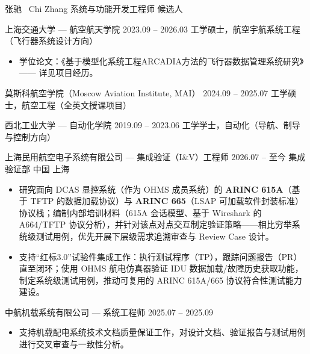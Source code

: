 \documentclass[zh]{resume}
\begin{document}
\resumeheader
  {张驰 \textbar\ Chi Zhang}
  {系统与功能开发工程师 候选人}
  {%
    \contactsep
    \contactsep
    \contactsep
  }


\resumeentry
  {上海交通大学 --- 航空航天学院}
  {2023.09 -- 2026.03}
  {工学硕士，航空宇航系统工程（飞行器系统设计方向）}
  {}
\begin{itemize}
  \item 学位论文：《基于模型化系统工程ARCADIA方法的飞行器数据管理系统研究》—— 详见项目经历。
\end{itemize}

\resumeentry
  {莫斯科航空学院（Moscow Aviation Institute, MAI）}
  {2024.09 -- 2025.07}
  {工学硕士，航空工程（全英文授课项目）}
  {}

\resumeentry
  {西北工业大学 --- 自动化学院}
  {2019.09 -- 2023.06}
  {工学学士，自动化（导航、制导与控制方向）}
  {}


\resumeentry
  {上海民用航空电子系统有限公司 --- 集成验证（I\&V）工程师}
  {2026.07 -- 至今}
  {集成验证部}
  {中国 上海}
\begin{itemize}
  \item 研究面向 DCAS 显控系统（作为 OHMS 成员系统）的 \textbf{ARINC 615A}（基于 TFTP 的数据加载协议）与 \textbf{ARINC 665}（LSAP 可加载软件封装标准）协议栈；编制内部培训材料（615A 会话模型、基于 Wireshark 的 A664/TFTP 协议分析），并针对该点对点交互制定验证策略——相比穷举系统级测试用例，优先开展下层级需求追溯审查与 Review Case 设计。
  \item 支持“红标3.0”试验件集成工作：执行测试程序（TP），跟踪问题报告（PR）直至闭环；使用 OHMS 航电仿真器验证 IDU 数据加载/故障历史获取功能，制定系统级测试用例，推动可复用的 ARINC 615A/665 协议符合性测试能力建设。
\end{itemize}

\resumeentry
  {中航机载系统有限公司 --- 系统工程师}
  {2025.07 -- 2025.09}
  {}
  {}
\begin{itemize}
  \item 支持机载配电系统技术文档质量保证工作，对设计文档、验证报告与测试用例进行交叉审查与一致性分析。
\end{itemize}
\end{document}
